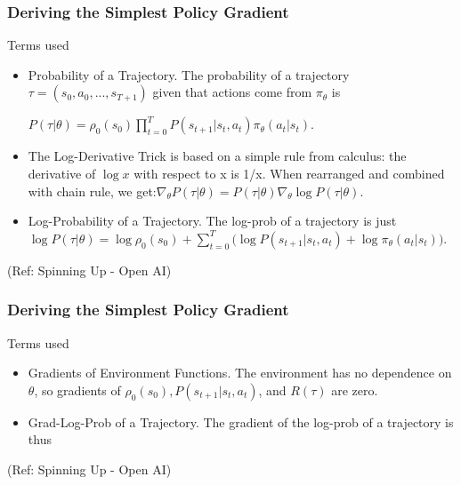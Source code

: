 \begin{frame}[fragile]\frametitle{Deriving the Simplest Policy Gradient}

Terms used
\begin{itemize}
\item  Probability of a Trajectory. The probability of a trajectory $\tau = (s_0, a_0, ..., s_{T+1})$ given that actions come from $\pi_{\theta}$ is

$P(\tau|\theta) = \rho_0 (s_0) \prod_{t=0}^{T} P(s_{t+1}|s_t, a_t) \pi_{\theta}(a_t |s_t)$.
\item  The Log-Derivative Trick is based on a simple rule from calculus: the derivative of $\log x$ with respect to x is 1/x. When rearranged and combined with chain rule, we get:$ \nabla_{\theta} P(\tau | \theta) = P(\tau | \theta) \nabla_{\theta} \log P(\tau | \theta)$.
\item Log-Probability of a Trajectory. The log-prob of a trajectory is just $\log P(\tau|\theta) = \log \rho_0 (s_0) + \sum_{t=0}^{T} \bigg( \log P(s_{t+1}|s_t, a_t)  + \log \pi_{\theta}(a_t |s_t)\bigg)$.
\end{itemize}

{\tiny (Ref: Spinning Up - Open AI)}
\end{frame}

\begin{frame}[fragile]\frametitle{Deriving the Simplest Policy Gradient}

Terms used
\begin{itemize}
\item   Gradients of Environment Functions. The environment has no dependence on $\theta$, so gradients of $\rho_0(s_0), P(s_{t+1}|s_t, a_t)$, and $R(\tau)$ are zero.
\item  Grad-Log-Prob of a Trajectory. The gradient of the log-prob of a trajectory is thus

\end{itemize}



{\tiny (Ref: Spinning Up - Open AI)}
\end{frame}

